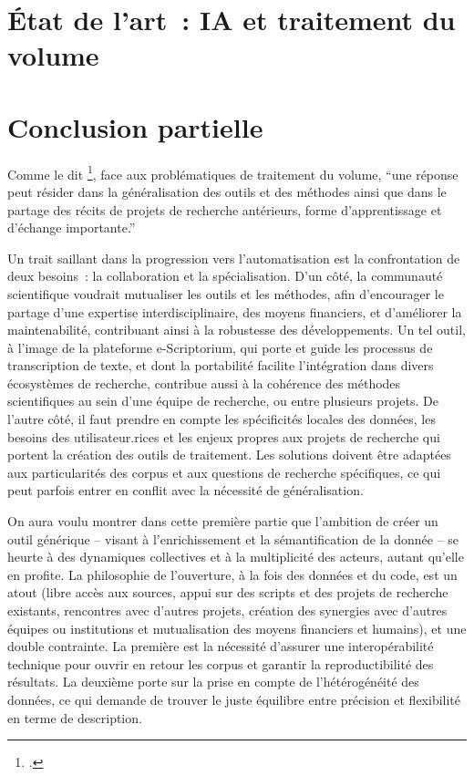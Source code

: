 \documentclass[a4paper,12pt,twoside]{book}
\newcommand{\clearemptydoublepage}{\newpage{\pagestyle{empty}\cleardoublepage}}
\begin{document}
                
            
        \clearemptydoublepage
        
\hypertarget{chapitre-3-EDA-image-ia}{%
\chapter{État de l'art~: IA et traitement du volume}\label{chapitre-3-EDA-image-ia}}

            
            
        \clearemptydoublepage
        
\chapter*{Conclusion partielle}
Comme le dit \citeauthor{jacquot_decrire_2017}\footcite{jacquot_decrire_2017}, face aux problématiques de traitement du volume, ``une réponse peut résider dans la généralisation des outils et
des méthodes ainsi que dans le partage des récits de projets de
recherche antérieurs, forme d'apprentissage et d'échange importante.''

Un trait saillant dans la progression vers l'automatisation est la
confrontation de deux besoins~: la collaboration et la spécialisation. D'un côté, la communauté scientifique voudrait mutualiser les outils et les méthodes, afin d'encourager le partage d'une expertise interdisciplinaire, des moyens financiers, et d'améliorer la maintenabilité, contribuant
ainsi à la robustesse des développements. Un tel outil, à l'image de la plateforme e-Scriptorium, qui porte et guide les processus de transcription de texte, et dont la portabilité facilite l'intégration dans divers écosystèmes de recherche, contribue aussi à la cohérence des méthodes scientifiques au sein d'une équipe de recherche, ou entre plusieurs projets. De l'autre côté, il faut prendre
en compte les spécificités locales des données, les besoins des
utilisateur.rices et les enjeux propres aux projets de recherche qui portent
la création des outils de traitement. Les solutions doivent être
adaptées aux particularités des corpus et aux questions de recherche
spécifiques, ce qui peut parfois entrer en conflit avec la nécessité de
généralisation. 

On aura voulu montrer dans cette première partie que l'ambition de créer un
outil générique -- visant à l'enrichissement et la sémantification de la
donnée -- se heurte à des dynamiques collectives et à la multiplicité des
acteurs, autant qu'elle en profite. La philosophie de l'ouverture, à la
fois des données et du code, est un atout (libre accès aux sources,
appui sur des scripts et des projets de recherche existants, rencontres
avec d'autres projets, création des synergies avec d'autres équipes ou
institutions et mutualisation des moyens financiers et humains), et une
double contrainte. La première est la nécessité d'assurer une
interopérabilité technique pour ouvrir en retour les corpus et garantir
la reproductibilité des résultats. La deuxième porte sur la prise en
compte de l'hétérogénéité des données, ce qui demande de trouver le
juste équilibre entre précision et flexibilité en terme de
description.
\end{document}
